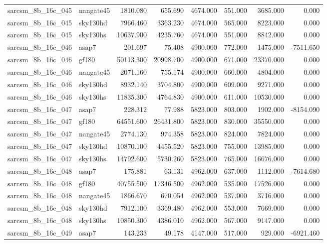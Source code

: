 \begin{tabular}{llrrrrrr}
sarcsm\_8b\_16c\_045 & nangate45 & 1810.080 & 655.690 & 4674.000 & 551.000 & 3685.000 & 0.000 \\
sarcsm\_8b\_16c\_045 & sky130hd & 7966.460 & 3363.230 & 4674.000 & 565.000 & 8223.000 & 0.000 \\
sarcsm\_8b\_16c\_045 & sky130hs & 10637.900 & 4235.760 & 4674.000 & 551.000 & 8842.000 & 0.000 \\
sarcsm\_8b\_16c\_046 & asap7 & 201.697 & 75.408 & 4900.000 & 772.000 & 1475.000 & -7511.650 \\
sarcsm\_8b\_16c\_046 & gf180 & 50113.300 & 20998.700 & 4900.000 & 671.000 & 23370.000 & 0.000 \\
sarcsm\_8b\_16c\_046 & nangate45 & 2071.160 & 755.174 & 4900.000 & 660.000 & 4804.000 & 0.000 \\
sarcsm\_8b\_16c\_046 & sky130hd & 8932.140 & 3704.800 & 4900.000 & 609.000 & 9271.000 & 0.000 \\
sarcsm\_8b\_16c\_046 & sky130hs & 11835.300 & 4764.830 & 4900.000 & 611.000 & 10530.000 & 0.000 \\
sarcsm\_8b\_16c\_047 & asap7 & 228.312 & 77.988 & 5823.000 & 803.000 & 1902.000 & -8154.090 \\
sarcsm\_8b\_16c\_047 & gf180 & 64551.600 & 26431.800 & 5823.000 & 830.000 & 35550.000 & 0.000 \\
sarcsm\_8b\_16c\_047 & nangate45 & 2774.130 & 974.358 & 5823.000 & 824.000 & 7824.000 & 0.000 \\
sarcsm\_8b\_16c\_047 & sky130hd & 10870.100 & 4455.520 & 5823.000 & 755.000 & 13985.000 & 0.000 \\
sarcsm\_8b\_16c\_047 & sky130hs & 14792.600 & 5730.260 & 5823.000 & 765.000 & 16676.000 & 0.000 \\
sarcsm\_8b\_16c\_048 & asap7 & 175.881 & 63.131 & 4962.000 & 637.000 & 1112.000 & -7614.680 \\
sarcsm\_8b\_16c\_048 & gf180 & 40755.500 & 17346.500 & 4962.000 & 535.000 & 17526.000 & 0.000 \\
sarcsm\_8b\_16c\_048 & nangate45 & 1866.670 & 670.054 & 4962.000 & 537.000 & 3716.000 & 0.000 \\
sarcsm\_8b\_16c\_048 & sky130hd & 7912.100 & 3369.480 & 4962.000 & 553.000 & 7669.000 & 0.000 \\
sarcsm\_8b\_16c\_048 & sky130hs & 10850.300 & 4386.010 & 4962.000 & 567.000 & 9147.000 & 0.000 \\
sarcsm\_8b\_16c\_049 & asap7 & 143.233 & 49.178 & 4147.000 & 517.000 & 929.000 & -6921.460 \\

\end{tabular}
